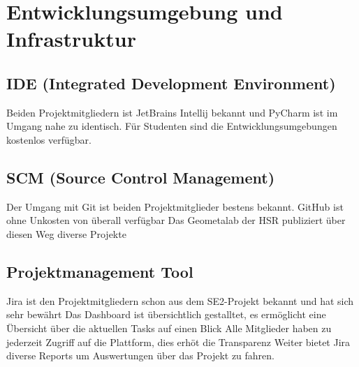 \section{Entwicklungsumgebung und Infrastruktur}
\subsection{IDE (Integrated Development Environment)}
Beiden Projektmitgliedern ist JetBrains Intellij bekannt und PyCharm ist im Umgang nahe zu identisch.
Für Studenten sind die Entwicklungsumgebungen kostenlos verfügbar.
\subsection{SCM (Source Control Management)}
Der Umgang mit Git ist beiden Projektmitglieder bestens bekannt.
GitHub ist ohne Unkosten von überall verfügbar
Das Geometalab der HSR publiziert über diesen Weg diverse Projekte
\subsection{Projektmanagement Tool}
Jira ist den Projektmitgliedern schon aus dem SE2-Projekt bekannt und hat sich sehr bewährt
Das Dashboard ist übersichtlich gestalltet, es ermöglicht eine Übersicht über die aktuellen Tasks auf einen Blick
Alle Mitglieder haben zu jederzeit Zugriff auf die Plattform, dies erhöt die Transparenz
Weiter bietet Jira diverse Reports um Auswertungen über das Projekt zu fahren.
